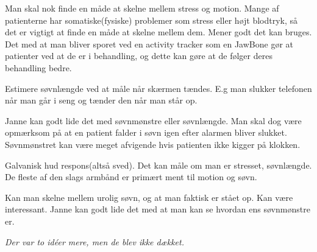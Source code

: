 \begin{description}[style=nextline]
    Man skal nok finde en måde at skelne mellem stress og motion. Mange af patienterne har somatiske(fysiske) problemer som stress eller højt blodtryk, så det er vigtigt at finde en måde at skelne mellem dem. Mener godt det kan bruges. Det med at man bliver sporet ved en activity tracker som en JawBone gør at patienter ved at de er i behandling, og dette kan gøre at de følger deres behandling bedre.
    
\item[Idé 9]
    Estimere søvnlængde ved at måle når skærmen tændes. E.g man slukker telefonen når man går i seng og tænder den når man står op. 
    
    Janne kan godt lide det med søvnmønstre eller søvnlængde. Man skal dog være opmærksom på at en patient falder i søvn igen efter alarmen bliver slukket. Søvnmønstret kan være meget afvigende hvis patienten ikke kigger på klokken.
\item[Idé 10]
    Galvanisk hud respons(altså sved). Det kan måle om man er stresset, søvnlængde. De fleste af den slags armbånd er primært ment til motion og søvn.
    
    Kan man skelne mellem urolig søvn, og at man faktisk er stået op.
    Kan være interessant. 
    Janne kan godt lide det med at man kan se hvordan ens søvnmønstre er.
\end{description}

\textit{Der var to idéer mere, men de blev ikke dækket.}        